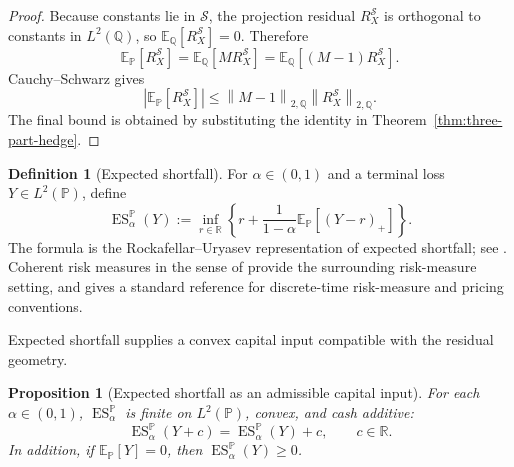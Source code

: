 \documentclass[11pt,a4paper]{amsart}
\theoremstyle{plain}
\newtheorem{proposition}[theorem]{Proposition}
\theoremstyle{definition}
\newtheorem{definition}[theorem]{Definition}
\theoremstyle{remark}
\newcommand{\R}{\mathbb{R}}
\newcommand{\PP}{\mathbb{P}}
\newcommand{\QQ}{\mathbb{Q}}
\newcommand{\EE}{\mathbb{E}}
\newcommand{\cS}{\mathcal{S}}
\newcommand{\norm}[1]{\left\lVert #1\right\rVert}
\newcommand{\ES}{\operatorname{ES}}
\begin{document}
\begin{proof}
Because constants lie in \(\cS\), the projection residual \(R_X^{\cS}\) is orthogonal to constants
in \(L^2(\QQ)\), so \(\EE_\QQ[R_X^{\cS}]=0\).  Therefore
\[
        \EE_\PP[R_X^{\cS}]
        =
        \EE_\QQ[M R_X^{\cS}]
        =
        \EE_\QQ[(M-1)R_X^{\cS}].
\]
Cauchy--Schwarz gives
\[
        |\EE_\PP[R_X^{\cS}]|
        \le
        \norm{M-1}_{2,\QQ}\norm{R_X^{\cS}}_{2,\QQ}.
\]
The final bound is obtained by substituting the identity in
Theorem~\ref{thm:three-part-hedge}.
\end{proof}

\begin{definition}[Expected shortfall]\label{def:expected-shortfall}
For \(\alpha\in(0,1)\) and a terminal loss \(Y\in L^2(\PP)\), define
\[
        \ES_{\alpha}^{\PP}(Y)
        :=
        \inf_{r\in\R}
        \left\{
        r+\frac{1}{1-\alpha}\EE_\PP[(Y-r)_+]
        \right\}.
\]
The formula is the Rockafellar--Uryasev representation of expected shortfall; see
\cite{rockafellarUryasev2000}.  Coherent risk measures in the sense of
\cite{artzner1999coherent} provide the surrounding risk-measure setting, and
\cite{follmerSchied2016} gives a standard reference for discrete-time risk-measure and pricing
conventions.
\end{definition}

Expected shortfall supplies a convex capital input compatible with the residual geometry.

\begin{proposition}[Expected shortfall as an admissible capital input]\label{prop:es-capital-input}
For each \(\alpha\in(0,1)\), \(\ES_\alpha^\PP\) is finite on \(L^2(\PP)\), convex, and cash
additive:
\[
        \ES_\alpha^\PP(Y+c)=\ES_\alpha^\PP(Y)+c,
        \qquad c\in\R.
\]
In addition, if \(\EE_\PP[Y]=0\), then \(\ES_\alpha^\PP(Y)\ge0\).
\end{proposition}
\end{document}
